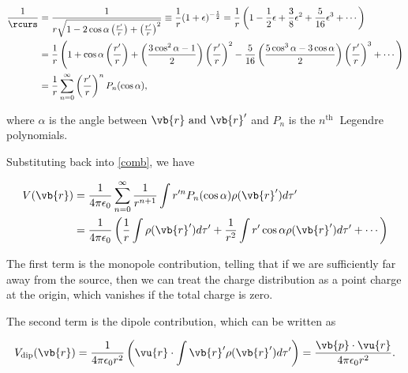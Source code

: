 \documentclass[english,a4paper,12pt]{report}
\begin{document}
\begin{equation} \label{1drj} 
    \begin{aligned} 
    \frac{1}{\rcurs } &= \frac{1}{ r \sqrt{1 - 2\cos \alpha \left( \frac{r'}{r}  \right) + \left( \frac{r'}{r}  \right)^2}} \equiv \frac{1}{r} (1 + \epsilon )^{-\frac{1}{2} } = \frac{1}{r} \left( 1 - \frac{1}{2}\epsilon  + \frac{3}{8} \epsilon ^2 + \frac{5}{16} \epsilon ^3 + \cdots  \right) \\
    &=\frac{1}{r} \left( 1 + \cos \alpha \left( \frac{r'}{r}  \right) + \left( \frac{3\cos ^2\alpha -1}{2} \right) \left( \frac{r'}{r}  \right)^2 -\frac{5}{16} \left( \frac{5\cos ^3 \alpha - 3\cos \alpha }{2} \right) \left( \frac{r'}{r} \right)^3 + \cdots \right) \\
    &= \frac{1}{r} \sum_{n=0}^{\infty} \left( \frac{r'}{r}  \right)^{n} P_{n}(\cos \alpha ),  
    \end{aligned} 
\end{equation}

where \(\alpha \) is the angle between \(\vb{r} \text { and } \vb{r} '\) and \(P_{n}\) is the \(n^{\text{th }} \) Legendre polynomials.    

Substituting back into \cref{comb}, we have 

\begin{equation}
    \begin{aligned} 
    V(\vb{r} ) &= \frac{1}{4\pi \epsilon _0} \sum_{n=0}^{\infty} \frac{1}{r^{n+1} } \int r'^{n} P_{n}(\cos \alpha )\rho (\vb{r} ')d\tau ' \\
    &= \frac{1}{4\pi \epsilon_0} \left( \frac{1}{r} \int \rho (\vb{r} ')d\tau ' + \frac{1}{r^2}\int r'\cos \alpha \rho (\vb{r} ')d\tau ' + \cdots  \right) 
    \end{aligned} 
\end{equation}

The first term is the monopole contribution, telling that if we are sufficiently far away from the source, then we can treat the charge distribution as a point charge at the origin, which vanishes if the total charge is zero.

The second term is the dipole contribution, which can be written as 

\begin{equation}
    V_{\text{dip} } (\vb{r} ) = \frac{1}{4\pi \epsilon_0r^2} \left( \vu{r}  \cdot \int \vb{r} ' \rho (\vb{r} ')d\tau '  \right) = \frac{\vb{p} \cdot \vu{r} }{4\pi \epsilon _0 r^2 }.    \label{dippotential} 
\end{equation}
\end{document}
